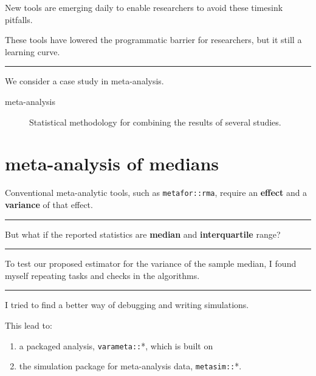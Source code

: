 \documentclass[article,30pt,extrafontsizes]{memoir}
\begin{document}
\begin{adjmulticols*}{3}{0.5in}{0.5in}
{New tools are emerging daily to enable researchers to avoid these
timesink pitfalls.

These tools have lowered the programmatic barrier for researchers, but
it still a learning curve.

\begin{center}\rule{0.5\linewidth}{\linethickness}\end{center}

We consider a case study in meta-analysis.

\begin{description}
\item[meta-analysis] Statistical methodology for combining the results of several studies. 

\end{description}

\hypertarget{meta-analysis-of-medians}{%
\section{meta-analysis of medians}\label{meta-analysis-of-medians}}

Conventional meta-analytic tools, such as \texttt{metafor::rma}, require
an \textbf{effect} and a \textbf{variance} of that effect.

\begin{center}\rule{0.5\linewidth}{\linethickness}\end{center}

But what if the reported statistics are \textbf{median} and
\textbf{interquartile} range?

\begin{center}\rule{0.5\linewidth}{\linethickness}\end{center}

To test our proposed estimator for the variance of the sample median, I
found myself repeating tasks and checks in the algorithms.

\begin{center}\rule{0.5\linewidth}{\linethickness}\end{center}

I tried to find a better way of debugging and writing simulations.

This lead to:

\begin{enumerate}
\def\labelenumi{\arabic{enumi}.}
\tightlist
\item
  a packaged analysis, \texttt{varameta::}*, which is built on
\item
  the simulation package for meta-analysis data, \texttt{metasim::}*.
\end{enumerate}

}
\end{adjmulticols*}
\end{document}
